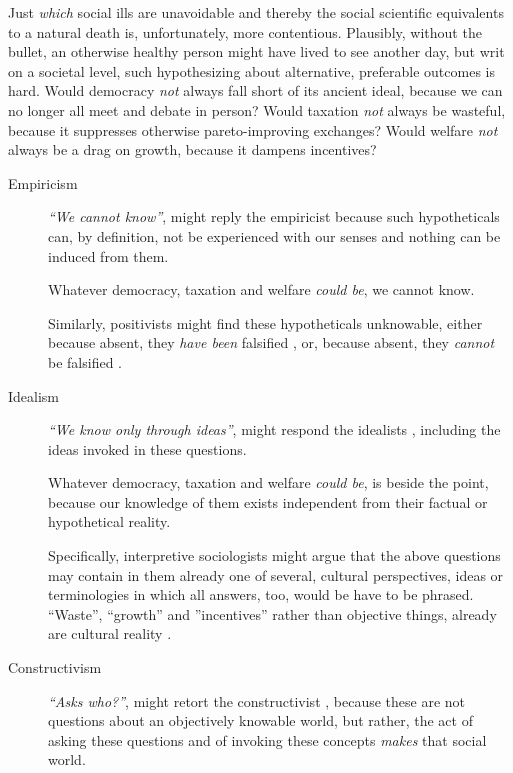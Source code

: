 Just \emph{which} social ills are unavoidable and thereby the social scientific equivalents to a natural death is, unfortunately, more contentious. 
Plausibly, without the bullet, an otherwise healthy person might have lived to see another day, but writ on a societal level, such hypothesizing about alternative, preferable outcomes is hard. 
Would democracy \emph{not} always fall short of its ancient ideal, because we can no longer all meet and debate in person? 
Would taxation \emph{not} always be wasteful, because it suppresses otherwise pareto-improving exchanges? 
Would welfare \emph{not} always be a drag on growth, because it dampens incentives?


\begin{description}
	\item[Empiricism \label{itm:empiricism}]
	\emph{``We cannot know''}, might reply the empiricist \citep{Bacon1620,Locke1689,Hume1739} because such hypotheticals can, by definition, not be experienced with our senses and nothing can be induced from them. %
	
	Whatever democracy, taxation and welfare \emph{could be}, we cannot know.
	
	Similarly, positivists might find these hypotheticals unknowable, either because absent, they \emph{have been} falsified \citep{Comte1842,Durkheim1895}, or, because absent, they \emph{cannot} be falsified \citep{Popper1934}.
	
	\item[Idealism  \label{itm:idealism}] 
	\emph{``We know only through ideas''}, might respond the idealists \citep[broadly][]{Kant1781,Hegel1807}, including the ideas invoked in these questions. 
	
	Whatever democracy, taxation and welfare \emph{could be}, is beside the point, because our knowledge of them exists independent from their factual or hypothetical reality. 
	
	Specifically, interpretive sociologists \citep{Weber1897} might argue that the above questions may contain in them already one of several, cultural perspectives, ideas or terminologies in which all answers, too, would be have to be phrased. 
	``Waste'', ``growth'' and ''incentives'' rather than objective things, already are cultural reality \citep[compare][]{Beland2010}.
	
	\item[Constructivism  \label{itm:constructivism}]
	\emph{``Asks \emph{who}?''}, might retort the constructivist \citep{Berger1966,Paul1984}, because these are not questions about an objectively knowable world, but rather, the act of asking these questions and of invoking these concepts \emph{makes} that social world.
	

\end{description}
